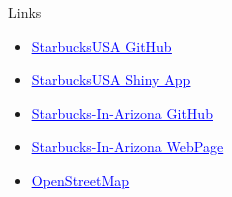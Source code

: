 \documentclass{beamer}
\begin{document}
\begin{frame}{
	\begin{minipage}[t]{0.75\textwidth}
		Links
	\end{minipage}
	\hfill
	\begin{minipage}[t]{0.25\textwidth}
		\flushright
	\end{minipage}
}{}
\begin{itemize}
	\item \href{https://github.com/gseamans/starbucksUsa}{\textcolor{blue}{\underline{StarbucksUSA GitHub}}}
	\item \href{https://gseamans.shinyapps.io/starbucksusa/}{\textcolor{blue}{\underline{StarbucksUSA Shiny App}}}
	\item \href{https://github.com/gseamans/Starbucks-In-Arizona}{\textcolor{blue}{\underline{Starbucks-In-Arizona GitHub}}}
	\item \href{https://gseamans.github.io/Starbucks-In-Arizona/}{\textcolor{blue}{\underline{Starbucks-In-Arizona WebPage}}}
	\item \href{https://www.openstreetmap.org/\#map=4/38.01/-95.84}{\textcolor{blue}{\underline{OpenStreetMap}}}
\end{itemize}

\end{frame}
\end{document}
